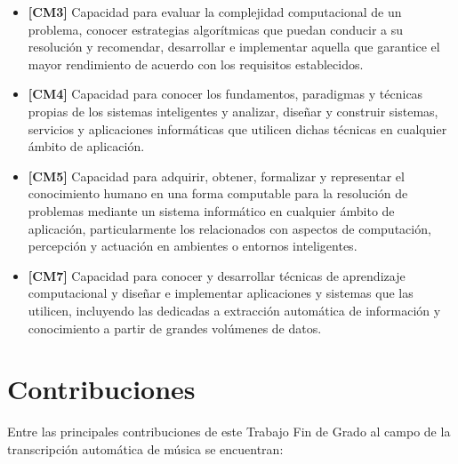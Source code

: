 \begin{itemize}
    \item \textbf{[CM3]} Capacidad para evaluar la complejidad computacional de un problema, conocer estrategias algorítmicas que puedan conducir a su resolución y recomendar, desarrollar e implementar aquella que garantice el mayor rendimiento de acuerdo con los requisitos establecidos. 

    \item \textbf{[CM4]} Capacidad para conocer los fundamentos, paradigmas y técnicas propias de los sistemas inteligentes y analizar, diseñar y construir sistemas, servicios y aplicaciones informáticas que utilicen dichas técnicas en cualquier ámbito de aplicación.

    \item \textbf{[CM5]} Capacidad para adquirir, obtener, formalizar y representar el conocimiento humano en una forma computable para la resolución de problemas mediante un sistema informático en cualquier ámbito de aplicación, particularmente los relacionados con aspectos de computación, percepción y actuación en ambientes o entornos inteligentes.


    \item \textbf{[CM7]} Capacidad para conocer y desarrollar técnicas de aprendizaje computacional y diseñar e implementar aplicaciones y sistemas que las utilicen, incluyendo las dedicadas a extracción automática de información y conocimiento a partir de grandes volúmenes de datos.
\end{itemize}

\vspace{1,5cm}
\section{Contribuciones}

Entre las principales contribuciones de este Trabajo Fin de Grado al campo de la transcripción automática de música se encuentran:

